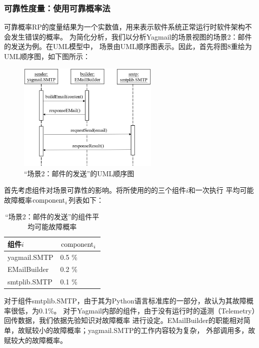 \documentclass[UTF8,12pt,a4paper]{ctexart}
\begin{document}
    \subsubsection{可靠性度量：使用可靠概率法}
    
    可靠概率RP的度量结果为一个实数值，用来表示软件系统正常运行时软件架构不会发生错误的概率。
    为简化分析，我们以分析Yagmail的场景视图的场景2：邮件的发送为例。在UML模型中，
    场景由UML顺序图表示。因此，首先将图8重绘为UML顺序图，如下图所示：
    
    \begin{figure}[H]
        \centering
        \includegraphics[width=0.6\textwidth]{figure/uml-seq.png}
        \caption{“场景2：邮件的发送”的UML顺序图}
        \label{fig:uml-seq}
    \end{figure}
    
    首先考虑组件对场景可靠性的影响。将所使用的的三个组件$i$和一次执行
    平均可能故障概率${\rm component}_i$列表如下：
    
    \begin{table}[H]
    \centering
    \caption{“场景2：邮件的发送”的组件平均可能故障概率}
    \label{tab:my-table}
    \begin{tabular}{l|l}
    \hline
    \textbf{组件$i$}          & \textbf{${\rm component}_i$} \\ \hline
    yagmail.SMTP & 0.5 \%                            \\ \hline
    EMailBuilder & 0.2 \%                            \\ \hline
    smtplib.SMTP & 0.1 \%                            \\ \hline
    \end{tabular}
    \end{table}
    
    对于组件smtplib.SMTP，由于其为Python语言标准库的一部分，故认为其故障概率很低，为0.1\%。
    对于Yagmail内部的组件，由于没有运行时的遥测（Telemetry）回传数据，我们依据先验知识对故障概率
    进行设定。EMailBuilder的职能相对简单，故赋较小的故障概率；yagmail.SMTP的工作内容较为复杂，
    外部调用多，故赋较大的故障概率。
    
\end{document}
